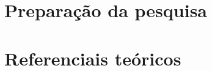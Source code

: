 \documentclass[
	12pt,				%
	openright,	%
	twoside,		%
	a4paper,		%
	english,			%
	french,				%
	spanish,			%
	brazil				%
	]{abntex2}
\begin{document}

\frenchspacing 



\textual



\part{Preparação da pesquisa}






\part{Referenciais teóricos}


\end{document}
